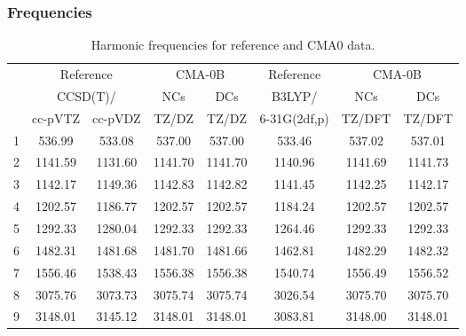 \documentclass[10pt,oneside]{article}
\begin{document}
\subsubsection*{Frequencies}
\begin{table}[h!]
\centering
\caption{Harmonic frequencies for reference and CMA0 data.}
\begin{tabular}{cccccccc}
\toprule
{} & \multicolumn{2}{c}{Reference} & \multicolumn{2}{c}{CMA-0B} &    Reference & \multicolumn{2}{c}{CMA-0B} \\
{} & \multicolumn{2}{c}{CCSD(T)/} &     NCs &     DCs &       B3LYP/ &     NCs &     DCs \\
{} &   cc-pVTZ & cc-pVDZ &   TZ/DZ &   TZ/DZ & 6-31G(2df,p) &  TZ/DFT &  TZ/DFT \\
\midrule
1 &    536.99 &  533.08 &  537.00 &  537.00 &       533.46 &  537.02 &  537.01 \\
2 &   1141.59 & 1131.60 & 1141.70 & 1141.70 &      1140.96 & 1141.69 & 1141.73 \\
3 &   1142.17 & 1149.36 & 1142.83 & 1142.82 &      1141.45 & 1142.25 & 1142.17 \\
4 &   1202.57 & 1186.77 & 1202.57 & 1202.57 &      1184.24 & 1202.57 & 1202.57 \\
5 &   1292.33 & 1280.04 & 1292.33 & 1292.33 &      1264.46 & 1292.33 & 1292.33 \\
6 &   1482.31 & 1481.68 & 1481.70 & 1481.66 &      1462.81 & 1482.29 & 1482.32 \\
7 &   1556.46 & 1538.43 & 1556.38 & 1556.38 &      1540.74 & 1556.49 & 1556.52 \\
8 &   3075.76 & 3073.73 & 3075.74 & 3075.74 &      3026.54 & 3075.70 & 3075.70 \\
9 &   3148.01 & 3145.12 & 3148.01 & 3148.01 &      3083.81 & 3148.00 & 3148.01 \\
\bottomrule
\end{tabular}
\end{table}

\clearpage
\end{document}
